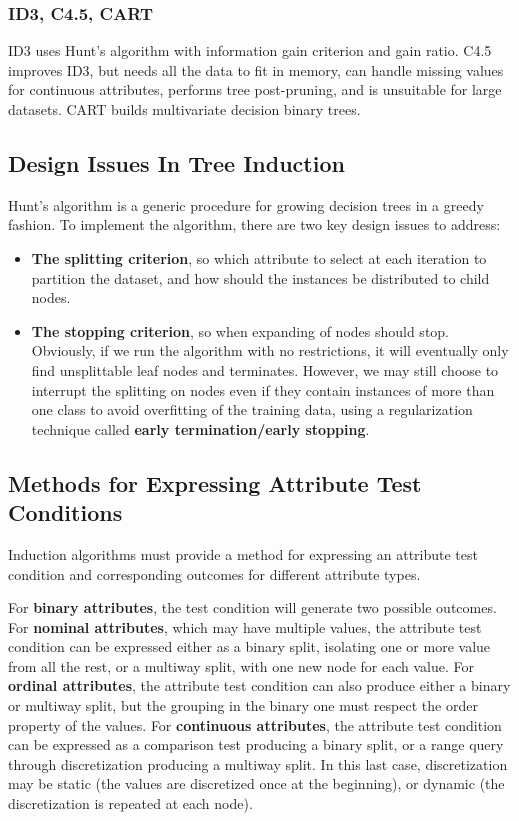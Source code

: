 \subsubsection{ID3, C4.5, CART}

ID3 uses Hunt's algorithm with information gain criterion and gain ratio. C4.5 improves ID3, but needs all the data to fit in memory, can handle missing values for continuous attributes, performs tree post-pruning, and is unsuitable for large datasets. CART builds multivariate decision binary trees.

\subsection{Design Issues In Tree Induction}

Hunt's algorithm is a generic procedure for growing decision trees in a greedy fashion. To implement the algorithm, there are two key design issues to address:

\begin{itemize}
    \item \textbf{The splitting criterion}, so which attribute to select at each iteration to partition the dataset, and how should the instances be distributed to child nodes.

    \item \textbf{The stopping criterion}, so when expanding of nodes should stop. Obviously, if we run the algorithm with no restrictions, it will eventually only find unsplittable leaf nodes and terminates. However, we may still choose to interrupt the splitting on nodes even if they contain instances of more than one class to avoid overfitting of the training data, using a regularization technique called \textbf{early termination/early stopping}.
\end{itemize}

\subsection{Methods for Expressing Attribute Test Conditions}

Induction algorithms must provide a method for expressing an attribute test condition and corresponding outcomes for different attribute types.

For \textbf{binary attributes}, the test condition will generate two possible outcomes. For \textbf{nominal attributes}, which may have multiple values, the attribute test condition can be expressed either as a binary split, isolating one or more value from all the rest, or a multiway split, with one new node for each value. For \textbf{ordinal attributes}, the attribute test condition can also produce either a binary or multiway split, but the grouping in the binary one must respect the order property of the values. For \textbf{continuous attributes}, the attribute test condition can be expressed as a comparison test producing a binary split, or a range query through discretization producing a multiway split. In this last case, discretization may be static (the values are discretized once at the beginning), or dynamic (the discretization is repeated at each node).

